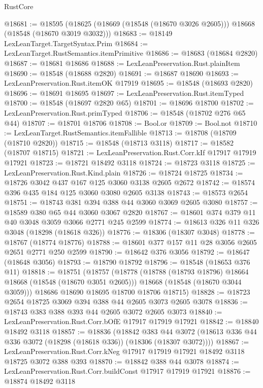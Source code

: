\begin{lexlean}{RustCore}
\begin{coremodule}
@18681 := @18595
    (@18625 (@18669 (@18548 (@18670 @3026 @2605))) @18668 (@18548 (@18670 @3019 @3032)))
@18683 := @18149 LexLeanTarget.TargetSyntax.Prim
@18684 := LexLeanTarget.RustSemantics.itemPrimitive
@18686 := @18683 (@18684 @2820)
@18687 := @18681 @18686
@18688 := LexLeanPreservation.Rust.plainItem
@18690 := @18548 (@18688 @2820)
@18691 := @18687 @18690
@18693 := LexLeanPreservation.Rust.itemOK @17919
@18695 := @18548 (@18693 @2820)
@18696 := @18691 @18695
@18697 := LexLeanPreservation.Rust.itemTyped
@18700 := @18548 (@18697 @2820 @65)
@18701 := @18696 @18700
@18702 := LexLeanPreservation.Rust.primTyped
@18706 := @18548 (@18702 @276 @65 @44)
@18707 := @18701 @18706
@18708 := Bool.or
@18709 := Bool.not
@18710 := LexLeanTarget.RustSemantics.itemFallible
@18713 := @18708 (@18709 (@18710 @2820))
@18715 := @18548 (@18713 @3118)
@18717 := @18582 (@18707 @18715)
@18721 := LexLeanPreservation.Rust.Corr.kIf @17917 @17919 @17921
@18723 := @18721 @18492 @3118
@18724 := @18723 @3118
@18725 := LexLeanPreservation.Rust.Kind.plain
@18726 := @18724 @18725
@18734 := @18726 @3042 @437 @167 @125 @3060 @3138 @2605 @2672
@18742 := @18574 @396 @435 @184 @125 @3060 @3080 @2605 @3138
@18743 := @18573 @2654
@18751 := @18743 @381 @394 @388 @44 @3060 @3069 @2605 @3080
@18757 := @18589 @380 @65 @44 @3060 @3067 @2820
@18767 := @18601 @374 @379 @11 @40 @3048 @3059 @3066 @2771 @245 @2599
@18774 := @18613 @326 @11 @326 @3048 (@18298 (@18618 @326))
@18776 := @18306 (@18307 @3048)
@18778 := @18767 (@18774 @18776)
@18788 := @18601 @377 @157 @11 @28 @3056 @2605 @2651 @2771 @250 @2599
@18790 := @18642 @376 @3056
@18792 := @18647 (@18648 @3056)
@18793 := @18790 @18792
@18796 := @18548 (@18653 @376 @11)
@18818 := @18751
    (@18757
      (@18778
        (@18788 (@18793 @18796) @18664 @18668 (@18548 (@18670 @3051 @2605)))
        @18668
        (@18548 (@18670 @3044 @3059)))
      @18686
      @18690
      @18695
      @18700
      @18706
      @18715)
@18828 := @18723 @2654 @18725 @3069 @394 @388 @44 @2605 @3073 @2605 @3078
@18836 := @18743 @383 @388 @393 @44 @2605 @3072 @2605 @3073
@18840 := LexLeanPreservation.Rust.Corr.bOfE @17917 @17919 @17921
@18842 := @18840 @18492 @3118
@18857 := @18836
    (@18842
      @383
      @44
      @3072
      (@18613 @336 @44 @336 @3072 (@18298 (@18618 @336)) (@18306 (@18307 @3072))))
@18867 := LexLeanPreservation.Rust.Corr.kNeg
    @17917
    @17919
    @17921
    @18492
    @3118
    @18725
    @3072
    @388
    @393
@18870 := @18842 @388 @44 @3078
@18874 := LexLeanPreservation.Rust.Corr.buildConst @17917 @17919 @17921
@18876 := @18874 @18492 @3118

\end{coremodule}
\end{lexlean}
